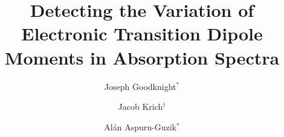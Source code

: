 



\title{Detecting the Variation of Electronic Transition Dipole Moments in Absorption Spectra}
\author{Joseph Goodknight$^*$}
\author{Jacob Krich$^{\dagger}$}
\author{Al\'an Aspuru-Guzik$^*$}
\begin{abstract}
  
\end{abstract}

\maketitle







